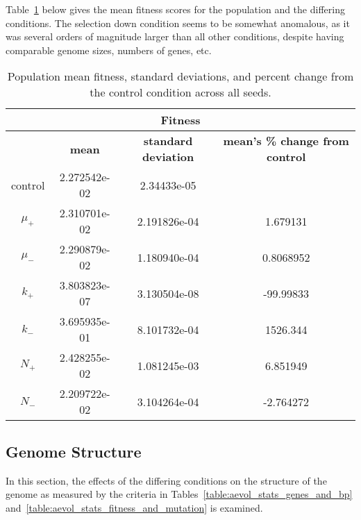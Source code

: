Table~\ref{table:fitness_means_std_dev} below gives the mean fitness scores for the population and the differing conditions. The selection down condition seems to be somewhat anomalous, as it was several orders of magnitude larger than all other conditions, despite having comparable genome sizes, numbers of genes, etc.
\begin{table}[H]
	\centering
	\begin{tabular}{|c||c|c|c|}
		\hline
		\multicolumn{4}{c}{\Large \textbf{Fitness}} \\
		\hline
		& \textbf{mean} & \textbf{standard deviation} & \textbf{mean's \% change from control} \\
		\hline \hline
		control & 2.272542e-02 & 2.34433e-05 & \textemdash \\ 
		\hline
		$\mu_+$ & 2.310701e-02 & 2.191826e-04 & 1.679131 \\ 
		\hline
		$\mu_-$ & 2.290879e-02 & 1.180940e-04 & 0.8068952 \\ 
		\hline
		$k_+$ & 3.803823e-07 & 3.130504e-08 & -99.99833 \\ 
		\hline
		$k_-$ & 3.695935e-01 & 8.101732e-04 & 1526.344 \\ 
		\hline
		$N_+$ & 2.428255e-02 & 1.081245e-03 & 6.851949 \\ 
		\hline
		$N_-$ & 2.209722e-02 & 3.104264e-04 & -2.764272 \\ 
		\hline
	\end{tabular}
	\caption[Fitness means and standard deviations.]{Population mean fitness, standard deviations, and percent change from the control condition across all seeds. }
	\label{table:fitness_means_std_dev}
\end{table}

\subsection{Genome Structure}
In this section, the effects of the differing conditions on the structure of the genome as measured by the criteria in Tables~\ref{table:aevol_stats_genes_and_bp} and~\ref{table:aevol_stats_fitness_and_mutation} is examined. 

